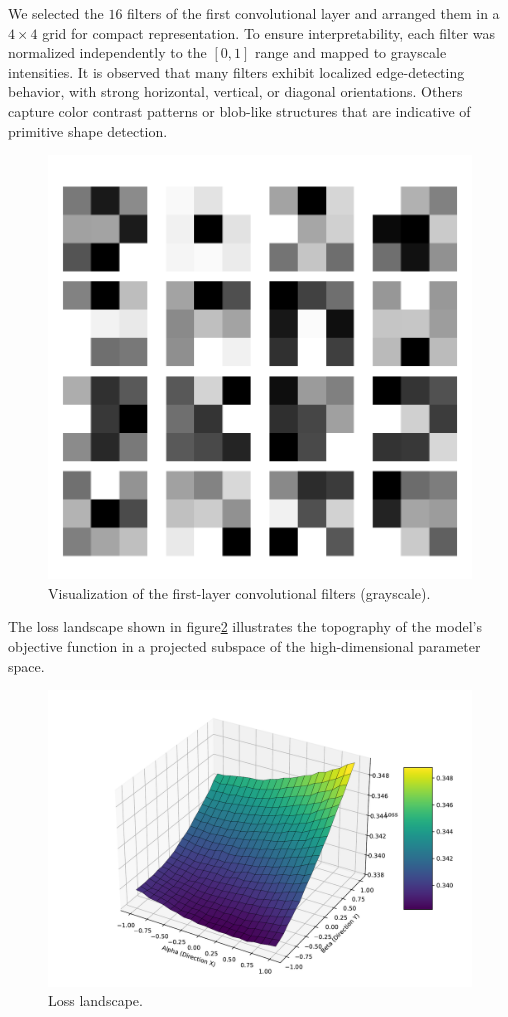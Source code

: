 \documentclass{article}
\begin{document}
We selected the $16$ filters of the first convolutional layer and arranged them in a $4\times 4$ grid for compact representation. To ensure interpretability, each filter was normalized independently to the $[0, 1]$ range and mapped to grayscale intensities. It is observed that many filters exhibit localized edge-detecting behavior, with strong horizontal, vertical, or diagonal orientations. Others capture color contrast patterns or blob-like structures that are indicative of primitive shape detection.

\begin{figure}[H]
  \centering
  \includegraphics[width=0.6\linewidth]{figures/filter_visualization.pdf}
  \caption{Visualization of the first-layer convolutional filters (grayscale).}
  \label{fig:first_layer_filters}
\end{figure}

The loss landscape shown in figure\ref{fig:loss_landscape} illustrates the topography of the model's objective function in a projected subspace of the high-dimensional parameter space.

\begin{figure}[H]
  \centering
  \includegraphics[width=0.8\linewidth]{figures/loss_landscape_3d.pdf}
  \caption{Loss landscape.}
  \label{fig:loss_landscape}
\end{figure}
\end{document}
